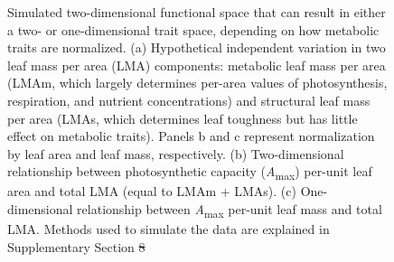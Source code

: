 \documentclass[
  12pt,
  letterpaper,
  DIV=11,
  numbers=noendperiod]{scrartcl}
\providecommand{\DIFadd}[1]{{\protect\color{blue}\uwave{#1}}} %
\providecommand{\DIFdel}[1]{{\protect\color{red}\sout{#1}}}                      %
\providecommand{\DIFaddFL}[1]{\DIFadd{#1}} %
\providecommand{\DIFdelFL}[1]{\DIFdel{#1}} %
\providecommand{\DIFaddbeginFL}{} %
\providecommand{\DIFaddendFL}{} %
\providecommand{\DIFdelbeginFL}{} %
\providecommand{\DIFdelendFL}{} %
\newcommand{\DIFscaledelfig}{0.5}
\newlength{\DIFdelgraphicswidth} %
\newlength{\DIFdelgraphicsheight} %
\newcommand{\DIFaddincludegraphics}[2][]{{\color{blue}\fbox{\DIFOincludegraphics[#1]{#2}}}} %
\newcommand{\DIFdelincludegraphics}[2][]{%
\sbox{\DIFdelgraphicsbox}{\DIFOincludegraphics[#1]{#2}}%
\settoboxwidth{\DIFdelgraphicswidth}{\DIFdelgraphicsbox} %
\settoboxtotalheight{\DIFdelgraphicsheight}{\DIFdelgraphicsbox} %
\scalebox{\DIFscaledelfig}{%
\parbox[b]{\DIFdelgraphicswidth}{\usebox{\DIFdelgraphicsbox}\\[-\baselineskip] \rule{\DIFdelgraphicswidth}{0em}}\llap{\resizebox{\DIFdelgraphicswidth}{\DIFdelgraphicsheight}{%
\setlength{\unitlength}{\DIFdelgraphicswidth}%
\begin{picture}(1,1)%
\thicklines\linethickness{2pt} %
{\color[rgb]{1,0,0}\put(0,0){\framebox(1,1){}}}%
{\color[rgb]{1,0,0}\put(0,0){\line( 1,1){1}}}%
{\color[rgb]{1,0,0}\put(0,1){\line(1,-1){1}}}%
\end{picture}%
}\hspace*{3pt}}} %
} %
\DeclareRobustCommand{\DIFaddbeginFL}{\DIFOaddbeginFL \let\includegraphics\DIFaddincludegraphics} %
\DeclareRobustCommand{\DIFaddendFL}{\DIFOaddendFL \let\includegraphics\DIFOincludegraphics} %
\DeclareRobustCommand{\DIFdelbeginFL}{\DIFOdelbeginFL \let\includegraphics\DIFdelincludegraphics} %
\DeclareRobustCommand{\DIFdelendFL}{\DIFOaddendFL \let\includegraphics\DIFOincludegraphics} %
\begin{document}
\begin{figure}


\caption{\label{fig-hypo}Simulated two-dimensional functional space that
can result in either a two- or one-dimensional trait space, depending on
how metabolic traits are normalized. (a) Hypothetical independent
variation in two leaf mass per area (LMA) components: metabolic leaf
mass per area (LMAm, which largely determines per-area values of
photosynthesis, respiration, and nutrient concentrations) and structural
leaf mass per area (LMAs, which determines leaf toughness but has little
effect on metabolic traits). Panels b and c represent normalization by
leaf area and leaf mass, respectively. (b) Two-dimensional relationship
between photosynthetic capacity (\emph{A}\textsubscript{max}) per-unit
leaf area and total LMA (equal to LMAm + LMAs). (c) One-dimensional
relationship between \emph{A}\textsubscript{max} per-unit leaf mass and
total LMA. Methods used to simulate the data are explained in
Supplementary Section \DIFdelbeginFL \DIFdelFL{8}\DIFdelendFL \DIFaddbeginFL \DIFaddFL{5.}\DIFaddendFL }

\end{figure}%

\newpage
\end{document}

